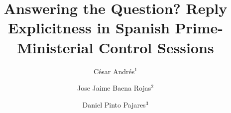 
\title{Answering the Question? Reply Explicitness in Spanish Prime-Ministerial Control Sessions}

\author{%
  C\'{e}sar Andr\'{e}s$^{1}$
  \and Jose Jaime Baena Rojas$^{2}$
  \and Daniel Pinto Pajares$^{3}$
}

\newcommand{\TitlePageAffiliations}{%
  $^{1}$ ORCID 0009-0001-8968-3404 \quad
  $^{2}$ ORCID 0000-0002-0915-4087 \quad
  $^{3}$ ORCID 0000-0001-9397-811X
}

\newcommand{\CorrespondingAuthor}{C\'{e}sar Andr\'{e}s, cesar.andres@unir.net}

\newcommand{\ConflictOfInterestPlaceholder}{%
  The authors declare that they have no known competing financial interests
  or personal relationships that could have appeared to influence the work
  reported in this paper.
}

\newcommand{\FundingPlaceholder}{%
  Funding statement to be confirmed before submission.
}
